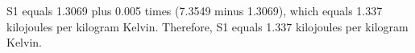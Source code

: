 S1 equals 1.3069 plus 0.005 times (7.3549 minus 1.3069), which equals 1.337 kilojoules per kilogram Kelvin. Therefore, S1 equals 1.337 kilojoules per kilogram Kelvin.